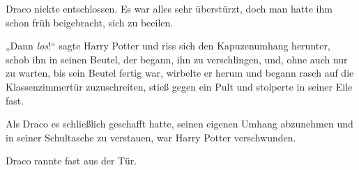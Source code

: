 Draco nickte entschlossen. Es war alles sehr überstürzt, doch man hatte ihm schon früh beigebracht, sich zu beeilen.

„Dann \emph{los}!“ sagte Harry Potter und riss sich den Kapuzenumhang herunter, schob ihn in seinen Beutel, der begann, ihn zu verschlingen, und, ohne auch nur zu warten, bis sein Beutel fertig war, wirbelte er herum und begann rasch auf die Klassenzimmertür zuzuschreiten, stieß gegen ein Pult und stolperte in seiner Eile fast.

Als Draco es schließlich geschafft hatte, seinen eigenen Umhang abzunehmen und in seiner Schultasche zu verstauen, war Harry Potter verschwunden.

Draco rannte fast aus der Tür.

